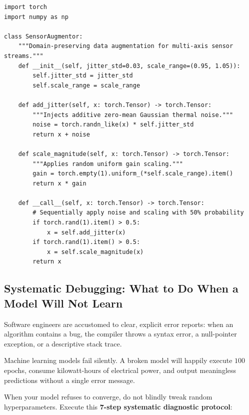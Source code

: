 \begin{lstlisting}[style=pythonstyle, caption={Modular data augmentation pipeline for physical sensor telemetry.}, label={lst:sensor_augmentation}]
import torch
import numpy as np

class SensorAugmentor:
    """Domain-preserving data augmentation for multi-axis sensor streams."""
    def __init__(self, jitter_std=0.03, scale_range=(0.95, 1.05)):
        self.jitter_std = jitter_std
        self.scale_range = scale_range

    def add_jitter(self, x: torch.Tensor) -> torch.Tensor:
        """Injects additive zero-mean Gaussian thermal noise."""
        noise = torch.randn_like(x) * self.jitter_std
        return x + noise

    def scale_magnitude(self, x: torch.Tensor) -> torch.Tensor:
        """Applies random uniform gain scaling."""
        gain = torch.empty(1).uniform_(*self.scale_range).item()
        return x * gain

    def __call__(self, x: torch.Tensor) -> torch.Tensor:
        # Sequentially apply noise and scaling with 50% probability
        if torch.rand(1).item() > 0.5:
            x = self.add_jitter(x)
        if torch.rand(1).item() > 0.5:
            x = self.scale_magnitude(x)
        return x
\end{lstlisting}

\subsection{Systematic Debugging: What to Do When a Model Will Not Learn}\label{subsec:debugging}

Software engineers are accustomed to clear, explicit error reports: when an algorithm contains a bug, the compiler throws a syntax error, a null-pointer exception, or a descriptive stack trace.

Machine learning models fail silently. A broken model will happily execute $100$ epochs, consume kilowatt-hours of electrical power, and output meaningless predictions without a single error message.

When your model refuses to converge, do not blindly tweak random hyperparameters. Execute this \textbf{7-step systematic diagnostic protocol}:

